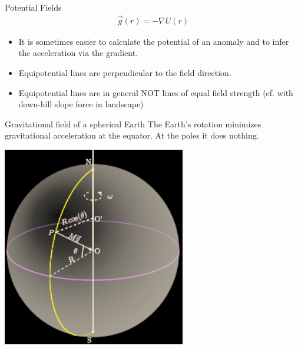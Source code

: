 \begin{frame}
  \begin{PointSix}{Potential Fields}
    \begin{align*}
      \vec{g}(r) = -\nabla U(r)
    \end{align*}
    \small
    \begin{itemize}
      \item It is sometimes easier to calculate the potential of an anomaly and to infer the acceleration via the gradient.
      \item Equipotential lines are perpendicular to the field direction.
      \item Equipotential lines are in general NOT lines of equal field strength (cf. with down-hill slope force in landscape)
    \end{itemize}
  \end{PointSix}
\end{frame}


\begin{frame}
\begin{PointSix}{Gravitational field of a spherical Earth}
  \small The Earth's rotation minimizes gravitational acceleration at the equator. At the poles it does nothing.
  \begin{center}
  \includegraphics[width=0.6\textwidth]{Figures/Gravity/Exported/GravityFieldEarthRotation_Reversed.png}
  \end{center}
\end{PointSix}
\end{frame}





